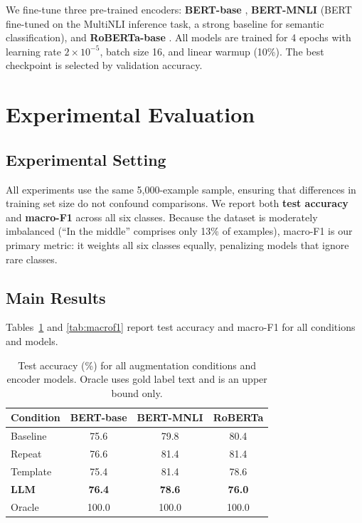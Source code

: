 \documentclass[11pt,a4paper]{article}
\begin{document}
We fine-tune three pre-trained encoders: \textbf{BERT-base} \citep{devlin2019bert}, \textbf{BERT-MNLI} \citep{devlin2019bert,williams2018mnli} (BERT fine-tuned on the MultiNLI inference task, a strong baseline for semantic classification), and \textbf{RoBERTa-base} \citep{liu2019roberta}. All models are trained for 4 epochs with learning rate $2 \times 10^{-5}$, batch size 16, and linear warmup (10\%). The best checkpoint is selected by validation accuracy.

\section{Experimental Evaluation}

\subsection{Experimental Setting}

All experiments use the same 5,000-example sample, ensuring that differences in training set size do not confound comparisons. We report both \textbf{test accuracy} and \textbf{macro-F1} across all six classes. Because the dataset is moderately imbalanced (``In the middle'' comprises only 13\% of examples), macro-F1 is our primary metric: it weights all six classes equally, penalizing models that ignore rare classes.

\subsection{Main Results}

Tables~\ref{tab:accuracy} and \ref{tab:macrof1} report test accuracy and macro-F1 for all conditions and models.

\begin{table}[t]
\centering
\small
\caption{Test accuracy (\%) for all augmentation conditions and encoder models. Oracle uses gold label text and is an upper bound only.}
\label{tab:accuracy}
\begin{tabular}{lccc}
\toprule
\textbf{Condition} & \textbf{BERT-base} & \textbf{BERT-MNLI} & \textbf{RoBERTa} \\
\midrule
Baseline  & 75.6 & 79.8 & 80.4 \\
Repeat    & 76.6 & 81.4 & 81.4 \\
Template  & 75.4 & 81.4 & 78.6 \\
\textbf{LLM} & \textbf{76.4} & \textbf{78.6} & \textbf{76.0} \\
\midrule
Oracle    & 100.0 & 100.0 & 100.0 \\
\bottomrule
\end{tabular}
\end{table}
\end{document}
